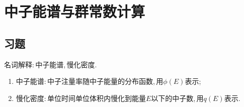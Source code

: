 \chapter{中子能谱与群常数计算}
\section*{习题}

\begin{exercise}
    名词解释:\,中子能谱,\,慢化密度.\,
    \begin{solution}
        \begin{enumerate}[(1)]
            \item 中子能谱:\,中子注量率随中子能量的分布函数,\,用$\phi(E)$表示;\,
            \item 慢化密度:\,单位时间单位体积内慢化到能量$E$以下的中子数,\,用$q(E)$表示.\,
        \end{enumerate}
    \end{solution}
\end{exercise}

